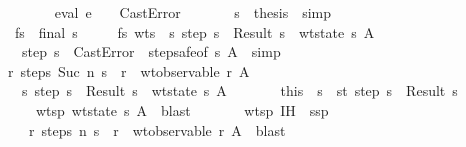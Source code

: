 \begin{isabellebody}
\ \ \ \ \isamarkupfalse \isanewline
\ \ \ \ \ \ \isamarkupfalse \ {\isachardoublequoteopen}eval\ e\ {\isasymrho}\ {\isasymmu}\ {\isacharequal}\ CastError{\isachardoublequoteclose}\isanewline
\ \ \ \ \ \ \isamarkupfalse \ s\ \isamarkupfalse \ {\isacharquery}thesis\ \isamarkupfalse \ simp\ \isamarkupfalse \isanewline
\ \ \ \ \isamarkupfalse \isanewline
\ \ \isacommand{{\isacharbraceright}}\isamarkupfalse \ \isamarkupfalse \ \isacommand{{\isacharbraceleft}}\isamarkupfalse \ \isamarkupfalse \ fs{\isacharcolon}\ {\isachardoublequoteopen}{\isasymnot}\ final\ s{\isachardoublequoteclose}\isanewline
\ \ \ \ \isamarkupfalse \ fs\ wts\ \isamarkupfalse \ {\isachardoublequoteopen}{\isacharparenleft}{\isasymexists}s{\isacharprime}{\isachardot}\ step\ s\ {\isacharequal}\ Result\ s{\isacharprime}\ {\isasymand}\ wt{\isacharunderscore}state\ s{\isacharprime}\ A{\isacharparenright}\isanewline
\ \ \ \ \ \ {\isasymor}\ step\ s\ {\isacharequal}\ CastError{\isachardoublequoteclose}\ \isamarkupfalse \ step{\isacharunderscore}safe{\isacharbrackleft}of\ s\ A{\isacharbrackright}\ \isamarkupfalse \ simp\isanewline
\ \ \ \ \isamarkupfalse \ {\isachardoublequoteopen}{\isasymexists}r{\isachardot}\ steps\ {\isacharparenleft}Suc\ n{\isacharparenright}\ s\ {\isacharequal}\ r\ {\isasymand}\ wt{\isacharunderscore}observable\ r\ A{\isachardoublequoteclose}\isanewline
\ \ \ \ \isamarkupfalse \isanewline
\ \ \ \ \ \ \isamarkupfalse \ {\isachardoublequoteopen}{\isasymexists}s{\isacharprime}{\isachardot}\ step\ s\ {\isacharequal}\ Result\ s{\isacharprime}\ {\isasymand}\ wt{\isacharunderscore}state\ s{\isacharprime}\ A{\isachardoublequoteclose}\isanewline
\ \ \ \ \ \ \isamarkupfalse \ this\ \isamarkupfalse \ s{\isacharprime}\ \ st{\isacharcolon}\ {\isachardoublequoteopen}step\ s\ {\isacharequal}\ Result\ s{\isacharprime}{\isachardoublequoteclose}\ \isanewline
\ \ \ \ \ \ \ \ \ wtsp{\isacharcolon}\ {\isachardoublequoteopen}wt{\isacharunderscore}state\ s{\isacharprime}\ A{\isachardoublequoteclose}\ \isamarkupfalse \ blast\isanewline
\ \ \ \ \ \ \isamarkupfalse \ wtsp\ IH\ \isamarkupfalse \ ssp{\isacharcolon}\isanewline
\ \ \ \ \ \ \ \ {\isachardoublequoteopen}{\isasymexists}r{\isachardot}\ steps\ n\ s{\isacharprime}\ {\isacharequal}\ r\ {\isasymand}\ wt{\isacharunderscore}observable\ r\ A{\isachardoublequoteclose}\ \isamarkupfalse \ blast\isanewline

\end{isabellebody}
